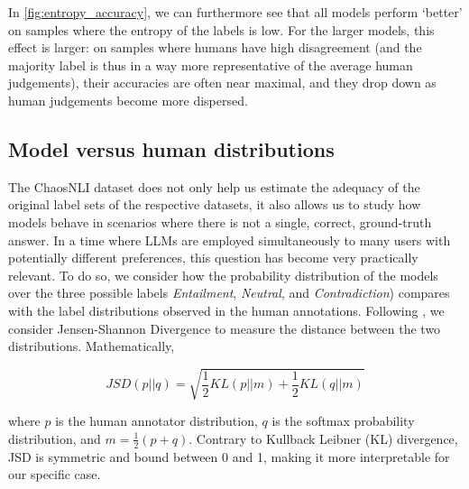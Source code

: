 In \cref{fig:entropy_accuracy}, we can furthermore see that all models perform `better' on samples where the entropy of the labels is low.
For the larger models, this effect is larger: on samples where humans have high disagreement (and the majority label is thus in a way more representative of the average human judgements), their accuracies are often near maximal, and they drop down as human judgements become more dispersed.

\subsection{Model versus human distributions}\label{subsec:chaosnli_dist}
The ChaosNLI dataset does not only help us estimate the adequacy of the original label sets of the respective datasets, it also allows us to study how models behave in scenarios where there is not a single, correct, ground-truth answer.
In a time where LLMs are employed simultaneously to many users with potentially different preferences, this question has become very practically relevant.
To do so, we consider how the probability distribution of the models over the three possible labels \textit{Entailment}, \textit{Neutral}, and \textit{Contradiction}) compares with the label distributions observed in the human annotations.
Following \citet{nie-etal-2020-learn}, we consider Jensen-Shannon Divergence \citep[JSD][]{menendez1997jensen} to measure the distance between the two distributions. Mathematically,

\[
    JSD(p || q) = \sqrt{\frac{1}{2}KL(p || m) + \frac{1}{2}KL(q || m)}
\]

where $p$ is the human annotator distribution, $q$ is the softmax probability distribution, and $m = \frac{1}{2}(p + q)$. Contrary to Kullback Leibner (KL) divergence, JSD is symmetric and bound between 0 and 1, making it more interpretable for our specific case.

